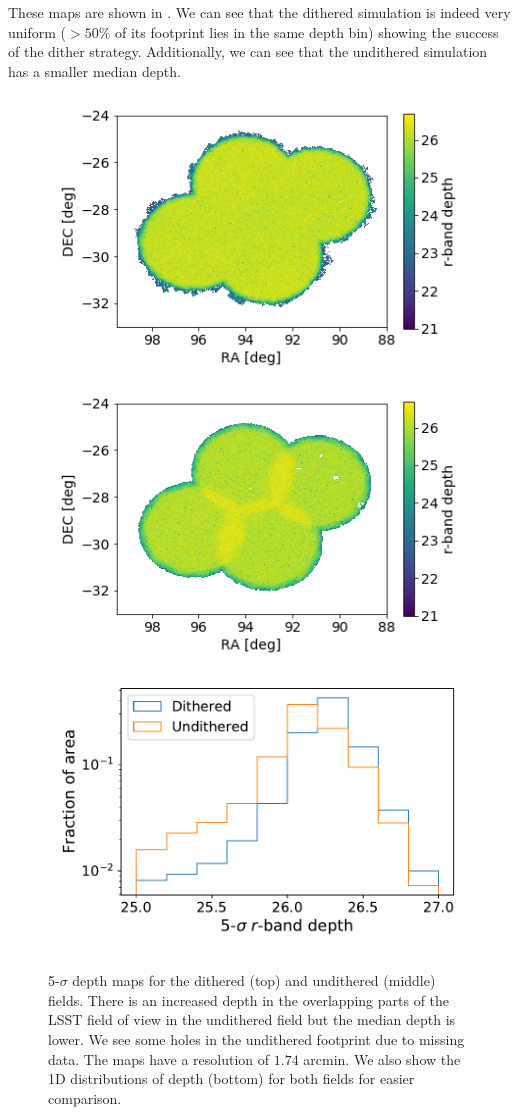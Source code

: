 \documentclass[\docopts]{\docclass}
\begin{document}
These maps are shown in . We can see that the dithered simulation is indeed very uniform ($> 50\%$ of its footprint lies in the same depth bin) showing the success of the dither strategy. Additionally, we can see that the undithered simulation has a smaller median depth.
\begin{figure}
\centering
\includegraphics[width=0.85\columnwidth]{dithered_depth.png}
\includegraphics[width=0.85\columnwidth]{undithered_depth.png}
\includegraphics[width=0.85\columnwidth]{depth_comparison_1d.pdf}
\caption{5-$\sigma$ depth maps for the dithered (top) and undithered (middle) fields. There is an increased depth in the overlapping parts of the LSST field of view in the undithered field but the median depth is lower. We see some holes in the undithered footprint due to missing data. The maps have a resolution of $1.74$ arcmin. We also show the 1D distributions of depth (bottom) for both fields for easier comparison.}
\label{fig:depth_maps}
\end{figure}
\end{document}
